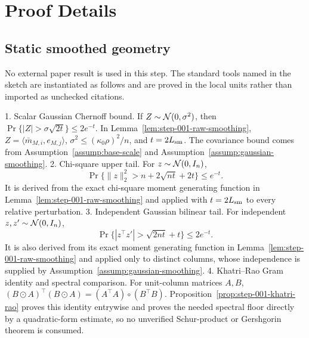 \appendix

\section{Proof Details}\label{sec:proof-details}

\subsection{Static smoothed geometry}\label{app:step-001}

No external paper result is used in this step. The standard tools named in the
sketch are instantiated as follows and are proved in the local units rather
than imported as unchecked citations.

1. Scalar Gaussian Chernoff bound. If $Z\sim {\cal N}(0,\sigma^2)$,
   then
   $\Pr\{|Z|>\sigma\sqrt{2t}\}\le2e^{-t}$.
   In Lemma~\ref{lem:step-001-raw-smoothing},
   $Z=\langle \bar m_{M,i},e_{M,j}\rangle$,
   $\sigma^2\le(\kappa _0\rho)^2/n$, and $t=2L_{\rm sm}$.
   The covariance bound comes from Assumption~\ref{assump:base-scale} and
   Assumption~\ref{assump:gaussian-smoothing}.
2. Chi-square upper tail. For $z\sim {\cal N}(0,I_n)$,
   \[
   \Pr\{\|z\|_2^2>n+2\sqrt{nt}+2t\}\le e^{-t}.
   \]
   It is derived from the exact chi-square moment generating function in
   Lemma~\ref{lem:step-001-raw-smoothing} and applied with
   $t=2L_{\rm sm}$ to every relative perturbation.
3. Independent Gaussian bilinear tail. For independent
   $z,z'\sim {\cal N}(0,I_n)$,
   \[
   \Pr\{|z^\top z'|>\sqrt{2nt}+t\}\le2e^{-t}.
   \]
   It is also derived from its exact moment generating function in
   Lemma~\ref{lem:step-001-raw-smoothing} and applied only to distinct
   columns, whose independence is supplied by
   Assumption~\ref{assump:gaussian-smoothing}.
4. Khatri--Rao Gram identity and spectral comparison. For unit-column
   matrices $A,B$,
   $(B\odot A)^\top(B\odot A)=(A^\top A)\circ(B^\top B)$.
   Proposition~\ref{prop:step-001-khatri-rao} proves this identity
   entrywise and proves the needed spectral floor directly by a quadratic-form
   estimate, so no unverified Schur-product or Gershgorin theorem is consumed.

